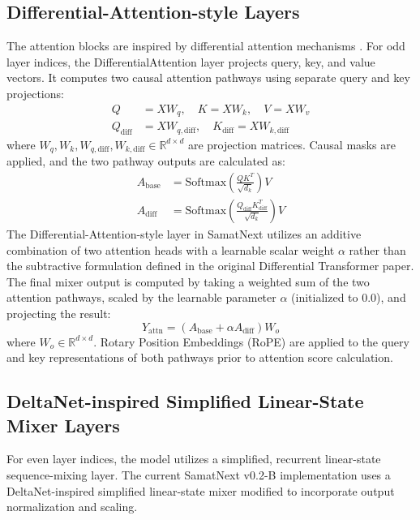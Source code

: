 \documentclass[11pt,a4paper]{article}
\begin{document}
\subsection{Differential-Attention-style Layers}
The attention blocks are inspired by differential attention mechanisms \cite{ye2024differential}. For odd layer indices, the DifferentialAttention layer projects query, key, and value vectors. It computes two causal attention pathways using separate query and key projections:
\begin{align}
    Q &= X W_q, \quad K = X W_k, \quad V = X W_v \\
    Q_{\text{diff}} &= X W_{q,\text{diff}}, \quad K_{\text{diff}} = X W_{k,\text{diff}}
\end{align}
where $W_q, W_k, W_{q,\text{diff}}, W_{k,\text{diff}} \in \mathbb{R}^{d \times d}$ are projection matrices. Causal masks are applied, and the two pathway outputs are calculated as:
\begin{align}
    A_{\text{base}} &= \text{Softmax}\left(\frac{Q K^T}{\sqrt{d_k}}\right) V \\
    A_{\text{diff}} &= \text{Softmax}\left(\frac{Q_{\text{diff}} K_{\text{diff}}^T}{\sqrt{d_k}}\right) V
\end{align}
The Differential-Attention-style layer in SamatNext utilizes an additive combination of two attention heads with a learnable scalar weight $\alpha$ rather than the subtractive formulation defined in the original Differential Transformer paper. The final mixer output is computed by taking a weighted sum of the two attention pathways, scaled by the learnable parameter $\alpha$ (initialized to $0.0$), and projecting the result:
\begin{equation}
    Y_{\text{attn}} = \left(A_{\text{base}} + \alpha A_{\text{diff}}\right) W_o
\end{equation}
where $W_o \in \mathbb{R}^{d \times d}$. Rotary Position Embeddings (RoPE) \cite{su2024roformer}
are applied to the query and key representations of both pathways prior to attention score calculation.

\subsection{DeltaNet-inspired Simplified Linear-State Mixer Layers}
For even layer indices, the model utilizes a simplified, recurrent linear-state sequence-mixing layer. The current SamatNext v0.2-B implementation uses a DeltaNet-inspired simplified linear-state mixer \cite{yang2024parallelizing} modified to incorporate output normalization and scaling.
\end{document}
